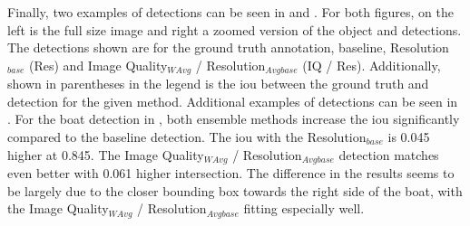 Finally, two examples of detections can be seen in  and . For both figures, on the left is the full size image and right a zoomed version of the object and detections. The detections shown are for the ground truth annotation, baseline, Resolution$_{base}$ (Res) and Image Quality$_{WAvg}$ / Resolution$_{Avgbase}$ (IQ / Res). Additionally, shown in parentheses in the legend is the \gls{iou} between the ground truth and detection for the given method. Additional examples of detections can be seen in .
For the boat detection in , both ensemble methods increase the \gls{iou} significantly compared to the baseline detection. The \gls{iou} with the Resolution$_{base}$ is 0.045 higher at 0.845. The Image Quality$_{WAvg}$ / Resolution$_{Avgbase}$ detection matches even better with 0.061 higher intersection. The difference in the results seems to be largely due to the closer bounding box towards the right side of the boat, with the Image Quality$_{WAvg}$ / Resolution$_{Avgbase}$ fitting especially well.



